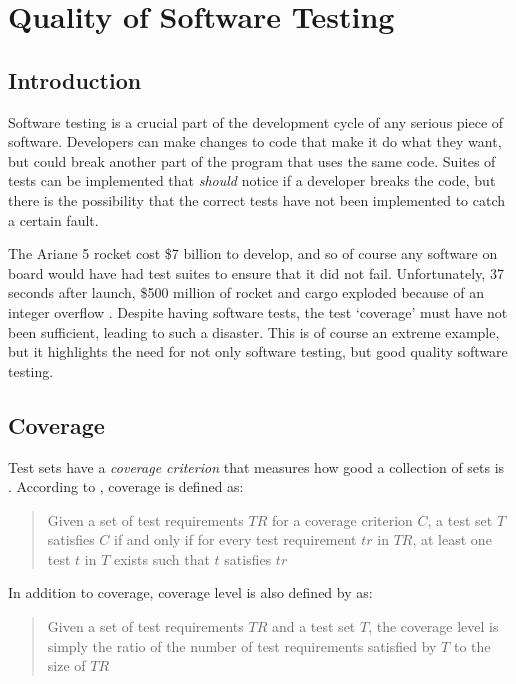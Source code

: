 \section{Quality of Software Testing}
\subsection{Introduction}
Software testing is a crucial part of the development cycle of any serious piece of software. Developers can make changes to code that make it do what they want, but could break another part of the program that uses the same code. Suites of tests can be implemented that \emph{should} notice if a developer breaks the code, but there is the possibility that the correct tests have not been implemented to catch a certain fault.

The Ariane 5 rocket cost \$7 billion to develop, and so of course any software on board would have had test suites to ensure that it did not fail. Unfortunately, 37 seconds after launch, \$500 million of rocket and cargo exploded because of an integer overflow \citep{ariane5}. Despite having software tests, the test `coverage' must have not been sufficient, leading to such a disaster. This is of course an extreme example, but it highlights the need for not only software testing, but good quality software testing.

\subsection{Coverage}

Test sets have a \emph{coverage criterion} that measures how good a collection of sets is \citep{softwareTestingIntro}. According to \citet{softwareTestingIntro}, coverage is defined as:

\begin{quote} Given a set of test requirements $TR$ for a coverage criterion $C$, a test set $T$ satisfies $C$ if and only if for every test requirement $tr$ in $TR$, at least one test $t$ in $T$ exists such that $t$ satisfies $tr$ \end{quote}

In addition to coverage, coverage level is also defined by \citep{softwareTestingIntro} as:

\begin{quote}Given a set of test requirements $TR$ and a test set $T$, the coverage level is simply the ratio of the number of test requirements satisfied by $T$ to the size of $TR$\end{quote}

